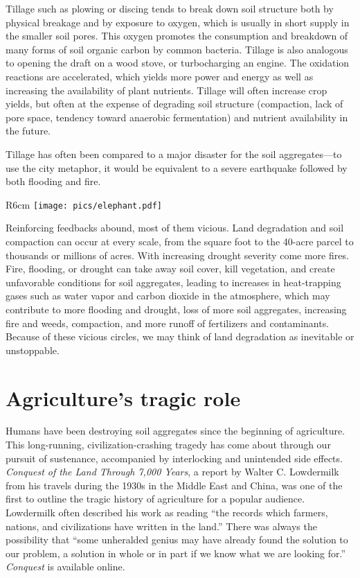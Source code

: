 \documentclass[11pt,letterpaper,twoside,onecolumn]{memoir}
\begin{document}
Tillage such as plowing or discing tends to break down soil structure both by physical breakage and by exposure to oxygen, which is usually in short supply in the smaller soil pores. This oxygen promotes the consumption and breakdown of many forms of soil organic carbon by common bacteria. Tillage is also analogous to opening the draft on a wood stove, or turbocharging an engine. The oxidation reactions are accelerated, which yields more power and energy as well as increasing the availability of plant nutrients. Tillage will often increase crop yields, but often at the expense of degrading soil structure (compaction, lack of pore space, tendency toward anaerobic fermentation) and nutrient availability in the future.

Tillage has often been compared to a major disaster for the soil aggregates---to use the city metaphor, it would be equivalent to a severe earthquake followed by both flooding and fire. 

\begin{wrapfigure}{R}{6cm}
\centering
\vspace{-2em}
\texttt{[image: pics/elephant.pdf]}
\end{wrapfigure}

Reinforcing feedbacks abound, most of them vicious. Land degradation and soil compaction can occur at every scale, from the square foot to the 40-acre parcel to thousands or millions of acres. With increasing drought severity come more fires. Fire, flooding, or drought can take away soil cover, kill vegetation, and create unfavorable conditions for soil aggregates, leading to increases in heat-trapping gases such as water vapor and carbon dioxide in the atmosphere, which may contribute to more flooding and drought, loss of more soil aggregates, increasing fire and weeds, compaction, and more runoff of fertilizers and contaminants. Because of these vicious circles, we may think of land degradation as inevitable or unstoppable.

\section*{Agriculture's tragic role}

Humans have been destroying soil aggregates since the beginning of agriculture.\label{tragedy} This long-running, civilization-crashing tragedy has come about through our pursuit of sustenance, accompanied by interlocking and unintended side effects. \textit{Conquest of the Land Through 7,000 Years}, a report by Walter C. Lowdermilk from his travels during the 1930s in the Middle East and China, was one of the first to outline the tragic history of agriculture for a popular audience. Lowdermilk often described his work as reading ``the records which farmers, nations, and civilizations have written in the land.'' There was always the possibility that ``some unheralded genius may have already found the solution to our problem, a solution in whole or in part if we know what we are looking for.'' \textit{Conquest} is available online.
\end{document}
